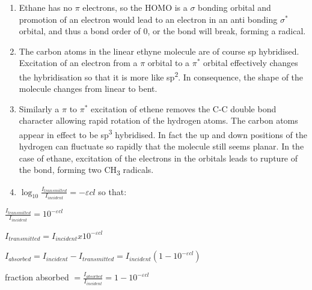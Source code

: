 \documentclass[
]{book}
\begin{document}
\begin{enumerate}
\def\labelenumi{\arabic{enumi}.}
\item
  Ethane has no \(\pi\) electrons, so the HOMO is a \(\sigma\) bonding orbital and promotion of an electron would lead to an electron in an anti bonding \(\sigma^\ast\) orbital, and thus a bond order of 0, or the bond will break, forming a radical.
\item
  The carbon atoms in the linear ethyne molecule are of course sp hybridised. Excitation of an electron from a \(\pi\) orbital to a \(\pi^\ast\) orbital effectively changes the hybridisation so that it is more like sp\textsuperscript{2}. In consequence, the shape of the molecule changes from linear to bent.
\item
  Similarly a \(\pi\) to \(\pi^\ast\) excitation of ethene removes the C-C double bond character allowing rapid rotation of the hydrogen atoms. The carbon atoms appear in effect to be sp\textsuperscript{3} hybridised. In fact the up and down positions of the hydrogen can fluctuate so rapidly that the molecule still seems planar. In the case of ethane, excitation of the electrons in the orbitals leads to rupture of the bond, forming two CH\textsubscript{3} radicals.
\item
  \(\log_{10} \frac{I_{transmitted}}{I_{incident}} = - \varepsilon cl\) so that:
\end{enumerate}

\(\frac{I_{transmitted}}{I_{incident}} =10^{- \varepsilon cl }\)

\(I_{transmitted} = I_{incident} x 10^{- \varepsilon cl }\)

\(I_{absorbed} = I_{incident} - I_{transmitted} = I_{incident} ( 1 - 10^{- \varepsilon cl })\)

fraction absorbed \(= \frac{I_{absorbed}}{I_{incident}} = 1 - 10^{- \varepsilon cl }\)
\end{document}
